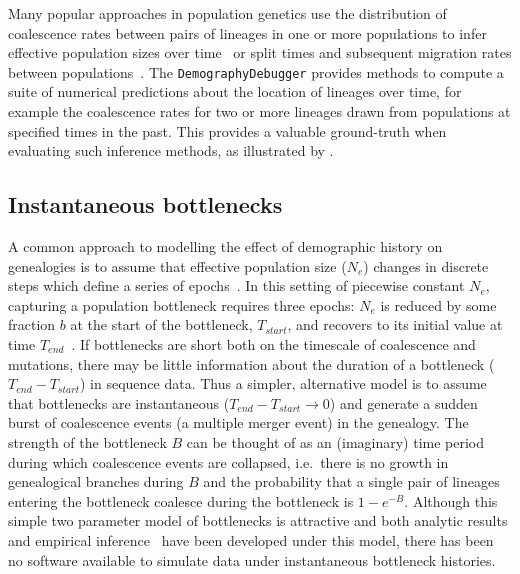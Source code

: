 \documentclass{article}
\begin{document}
Many popular approaches in population genetics use the distribution of
coalescence rates between pairs of lineages in one or more populations to infer
effective population sizes over
time~\citep{li2011inference,sheehan2013estimating,schiffels2014inferring} or
split times and subsequent migration rates between
populations~\citep{wang2020tracking}. The \texttt{DemographyDebugger} provides
methods to compute a suite of numerical predictions about the location of
lineages over time, for example the coalescence rates for two or more lineages
drawn from populations at specified times in the past. This provides a valuable
ground-truth when evaluating such inference methods, as illustrated by
\cite{adrion2020community}.

\subsection{Instantaneous bottlenecks}

A common approach to modelling the effect of demographic history on genealogies
is to assume that effective population size ($N_e$) changes in discrete steps
which define a series of epochs~\citep{griffiths1994sampling, marth2004allele,
keightley2007joint,li2011inference}. In this setting of piecewise constant
$N_e$, capturing a population bottleneck requires three epochs: $N_e$ is
reduced by some fraction $b$ at the start of the bottleneck, $T_{start}$, and
recovers to its initial value at time $T_{end}$~\citep{marth2004allele}. If
bottlenecks are short both on the timescale of coalescence and mutations,
there may be little information about the duration of a bottleneck
($T_{end}-T_{start}$) in sequence data. Thus a simpler, alternative model is to
assume that bottlenecks are instantaneous ($T_{end}-T_{start} \rightarrow 0$)
and generate a sudden burst of coalescence events (a multiple merger event) in
the genealogy. The strength of the bottleneck $B$ can be thought of as an
(imaginary) time period during which coalescence events are collapsed,
i.e.\ there is no growth in genealogical branches during $B$ and the probability that a
single pair of lineages entering the bottleneck coalesce during the bottleneck
is $1-e^{-B}$. Although this simple two parameter model of bottlenecks is
attractive and both analytic results and empirical
inference~\citep{griffiths1994sampling, galtier2000detecting,
bunnefeld2015inferring} have been developed under this model, there has
been no software available to simulate data under instantaneous
bottleneck histories.
\end{document}

